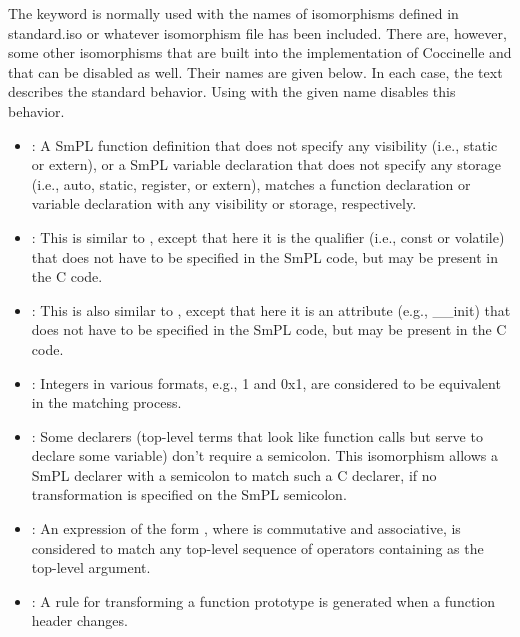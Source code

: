 The keyword  is normally used with the names of
isomorphisms defined in standard.iso or whatever isomorphism file has been
included.  There are, however, some other isomorphisms that are built into
the implementation of Coccinelle and that can be disabled as well.  Their
names are given below.  In each case, the text describes the standard
behavior.  Using  with the given name disables this behavior.

\begin{itemize}
\item {}: A SmPL function definition that does not
  specify any visibility (i.e., static or extern), or a SmPL variable
  declaration that does not specify any storage (i.e., auto, static,
  register, or extern), matches a function declaration or variable
  declaration with any visibility or storage, respectively.
\item {}: This is similar to ,
  except that here it is the qualifier (i.e., const or volatile) that does
  not have to be specified in the SmPL code, but may be present in the C code.
\item {}: This is also similar to
  , except that here it is an attribute (e.g.,
  \_\_init) that does not have to be specified in the SmPL code, but may be
  present in the C code.
\item {}: Integers in various formats, e.g., 1 and 0x1, are
  considered to be equivalent in the matching process.
\item {}: Some declarers (top-level terms
  that look like function calls but serve to declare some variable) don't
  require a semicolon.  This isomorphism allows a SmPL declarer with a semicolon
  to match such a C declarer, if no transformation is specified on the SmPL
  semicolon.
\item {}: An expression of the form  
  , where  is commutative and associative, is
  considered to match any top-level sequence of  operators
  containing  as the top-level argument.
\item {}: A rule for transforming a function prototype is
  generated when a function header changes.
\end{itemize}


